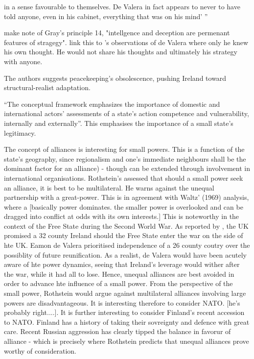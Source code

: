 in a sense favourable to themselves. De Valera in fact appears to never to have told anyone, even in his cabinet, everything that was on his mind' ''

 \parencite{GRAY_2018} make note of Gray's principle 14, "intellgence and deception are permenant features of stragegy". link this to \parencite{FANNING_2015}'s observations of de Valera where only he knew his own thought. He would not share his thoughts and ultimately his strategy with anyone.                                                                                                                                    

 \textcite{DUMAN_2025} The authors suggests peacekeeping’s obsolescence, pushing Ireland toward structural-realist adaptation.
 
\parencite{THORHALLSSON_2006} ``The conceptual framework emphasizes the
importance of domestic and international actors’ assessments of a state’s
action competence and vulnerability, internally and externally''. This emphasises the importance of a small state's legitimacy. 

\parencite{KEOHANE_1969,ROTHSTEIN_1966}  The concept of alliances is interesting for small powers. This is a function of the state's geography, since regionalism and one's immediate neighbours shall be the dominant factor for an alliance) - though can be extended through involvement in international organisations.    Rothstein's assessed that should a small power seek an alliance, it is best to be multilateral. He warns against the unequal partnership with a great-power. This is in agreement with Waltz' (1969) analysis, where a  [basically power dominates. the smaller power is overlooked and can be dragged into conflict at odds with its own interests.] This is noteworthy in the context of the Free State during the Second World War. As reported by \parencite{FANNING_2015}, the UK promised a 32 county Ireland should the Free State enter the war on the side of hte UK. Eamon de Valera prioritised independence of a 26 county coutry over the possiblity of future reunification. As a realist, de Valera would have been acutely aware of hte power dynamics, seeing that Ireland's leverage would wither after the war, while it had all to lose. Hence, unequal alliances are best avoided in order to advance hte influence of a small power. From the perspective of the small power, Rothstein would argue against multilateral alliances involving large powers are disadvantageous. It is interesting therefore to consider NATO. [he's probably right....]. It is further interesting to consider Finland's recent accession to NATO. Finland has a history of taking their sovreignty and defence with great care. Recent Russian aggression has clearly tipped the balance in favorur of alliance - which is precisely where Rothstein predicts that unequal alliances prove worthy of consideration.
                                                                                                                              
